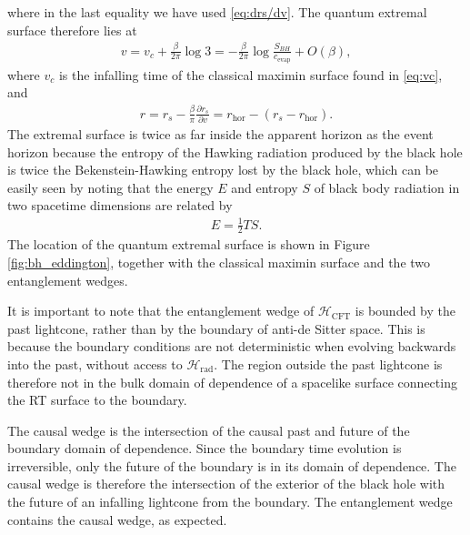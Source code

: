 \documentclass[11pt,a4paper]{article}
\begin{document}
where in the last equality we have used \eqref{eq:drs/dv}. The quantum extremal surface therefore lies at 
\begin{align} \label{eq:vq}
v = v_c + \frac{\beta}{2\pi} \log 3 = - \frac{\beta}{2 \pi} \log \frac{S_{BH}}{c_\text{evap}} + O(\beta),
\end{align}
where $v_c$ is the infalling time of the classical maximin surface found in \eqref{eq:vc}, and
\begin{align} \label{eq:rq}
r = r_s - \frac{\beta}{\pi} \frac{\partial r_s}{\partial v} = r_\text{hor} - (r_s - r_\text{hor}).
\end{align}
The extremal surface is twice as far inside the apparent horizon as the event horizon because the entropy of the Hawking radiation produced by the black hole is twice the Bekenstein-Hawking entropy lost by the black hole, which can be easily seen by noting that the energy $E$ and entropy $S$ of black body radiation in two spacetime dimensions are related by 
\begin{align}
E = \frac{1}{2} T S.
\end{align}
The location of the quantum extremal surface is shown in Figure \ref{fig:bh_eddington}, together with the classical maximin surface and the two entanglement wedges. 

It is important to note that the entanglement wedge of $\mathcal{H}_\text{CFT}$ is bounded by the past lightcone, rather than by the boundary of anti-de Sitter space. This is because the boundary conditions are not deterministic when evolving backwards into the past, without access to $\mathcal{H}_\text{rad}$. The region outside the past lightcone is therefore not in the bulk domain of dependence of a spacelike surface connecting the RT surface to the boundary.

The causal wedge is the intersection of the causal past and future of the boundary domain of dependence. Since the boundary time evolution is irreversible, only the future of the boundary is in its domain of dependence. The causal wedge is therefore the intersection of the exterior of the black hole with the future of an infalling lightcone from the boundary. The entanglement wedge contains the causal wedge, as expected.
\end{document}
